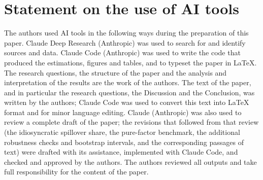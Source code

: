 \section*{Statement on the use of AI tools}
The authors used AI tools in the following ways during the preparation of this paper.
Claude Deep Research (Anthropic) was used to search for and identify sources and data.
Claude Code (Anthropic) was used to write the code that produced the estimations,
figures and tables, and to typeset the paper in LaTeX. The research questions, the
structure of the paper and the analysis and interpretation of the results are the
work of the authors. The text of the paper, and in particular the research questions,
the Discussion and the Conclusion, was written by the authors; Claude Code was used
to convert this text into LaTeX format and for minor language editing. Claude (Anthropic) was also used to review a complete draft of the paper; the revisions that followed from that review (the idiosyncratic spillover share, the pure-factor benchmark, the additional robustness checks and bootstrap intervals, and the corresponding passages of text) were drafted with its assistance, implemented with Claude Code, and checked and approved by the authors.
The authors
reviewed all outputs and take full responsibility for the content of the paper.
